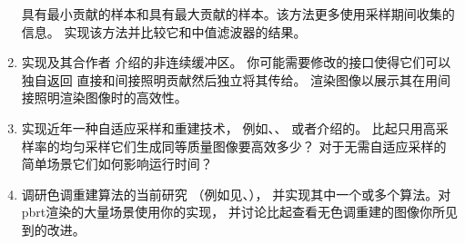 \begin{enumerate}
            具有最小贡献的样本和具有最大贡献的样本。该方法更多使用采样期间收集的信息。
            实现该方法并比较它和中值滤波器的结果。
      \item \circlethree 实现\citeauthor{keller1998quasi}及其合作者
            介绍的非连续缓冲区\citep{keller1998quasi,10.2312:EGWR:EGWR02:015-024}。
            你可能需要修改的接口使得它们可以独自返回
            直接和间接照明贡献然后独立将其传给。
            渲染图像以展示其在用间接照明渲染图像时的高效性。
      \item \circlethree 实现近年一种自适应采样和重建技术，
            例如\citet{10.1145/1360612.1360632}、\citet{10.1145/1531326.1531399}、
            \citet{10.1145/1618452.1618486}或者\citet{10.1145/2641762}介绍的。
            比起只用高采样率的均匀采样它们生成同等质量图像要高效多少？
            对于无需自适应采样的简单场景它们如何影响运行时间？
      \item \circlethree 调研色调重建算法的当前研究
            （例如见\citet{reinhard2010high}、\citet{10.1145/2366145.2366220}），
            并实现其中一个或多个算法。对pbrt渲染的大量场景使用你的实现，
            并讨论比起查看无色调重建的图像你所见到的改进。
\end{enumerate}